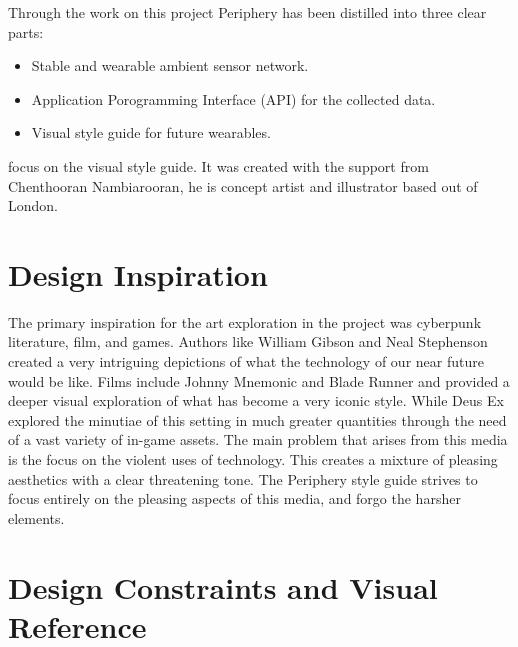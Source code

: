 
Through the work on this project Periphery has been distilled into three clear parts: 

\begin{itemize}
  \item Stable and wearable ambient sensor network.
  \item Application Porogramming Interface (API) for the collected data.
  \item Visual style guide for future wearables.
\end{itemize}

 focus on the visual style guide. It was created with the support from Chenthooran Nambiarooran, he is concept artist and illustrator based out of London.

\section{Design Inspiration}

The primary inspiration for the art exploration in the project was cyberpunk literature, film, and games. Authors like William Gibson and Neal Stephenson created a very intriguing depictions of what the technology of our near future would be like. Films include Johnny Mnemonic and Blade Runner and provided a deeper visual exploration of what has become a very iconic style. While Deus Ex explored the minutiae of this setting in much greater quantities through the need of a vast variety of in-game assets. The main problem that arises from this media is the focus on the violent uses of technology. This creates a mixture of pleasing aesthetics with a clear threatening tone. The Periphery style guide strives to focus entirely on the pleasing aspects of this media, and forgo the harsher elements.
\FloatBarrier

\section{Design Constraints and Visual Reference}\label{sec:designconstraints}


